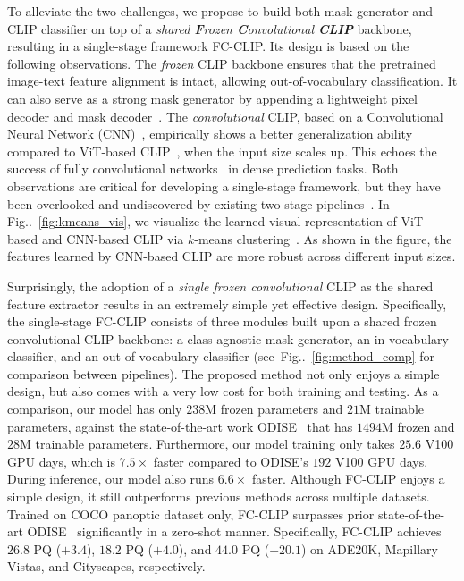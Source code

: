 \documentclass{article}
\makeatletter
\DeclareRobustCommand\onedot{\futurelet\@let@token\@onedot}
\def\@onedot{\ifx\@let@token.\else.\null\fi\xspace}
\newcommand{\figref}[1]{Fig\onedot~\ref{#1}}
\newcommand{\modelname}{FC-CLIP\xspace}
\makeatother
\begin{document}
To alleviate the two challenges, we propose to build both mask generator and CLIP classifier on top of a \textit{shared \textbf{F}rozen \textbf{C}onvolutional \textbf{CLIP}} backbone, resulting in a single-stage framework \modelname.
Its design is based on the following observations.
The \textit{frozen} CLIP backbone ensures that the pretrained image-text feature alignment is intact, allowing out-of-vocabulary classification.
It can also serve as a strong mask generator by appending a lightweight pixel decoder and mask decoder~\cite{cheng2021masked, yu2022k}.
The \textit{convolutional} CLIP, based on a Convolutional Neural Network (CNN)~\cite{lecun1998gradient}, empirically
shows a better generalization ability compared to ViT-based CLIP~\cite{dosovitskiy2020image}, when the input size scales up. 
This echoes the success of fully convolutional networks~\cite{long2014fully} in dense prediction tasks.
Both observations are critical for developing a single-stage framework, but they have been overlooked and undiscovered by existing two-stage pipelines~\cite{ding2022open,xu2023open}.
In \figref{fig:kmeans_vis}, we visualize the learned visual representation of ViT-based and CNN-based CLIP via $k$-means clustering~\cite{lloyd1982least}.
As shown in the figure, the features learned by CNN-based CLIP are more robust across different input sizes.

Surprisingly, the adoption of a \textit{single frozen convolutional} CLIP as the shared feature extractor results in an extremely simple yet effective design.
Specifically, the single-stage \modelname consists of three modules built upon a shared frozen convolutional CLIP backbone: a class-agnostic mask generator, an in-vocabulary classifier, and an out-of-vocabulary classifier (see~\figref{fig:method_comp} for comparison between pipelines).
The proposed method not only enjoys a simple design, but also comes with a very low cost for both training and testing.
As a comparison, our model has only $238$M frozen parameters and $21$M trainable parameters, against the state-of-the-art work ODISE~\cite{xu2023open} that has $1494$M frozen and $28$M trainable parameters.
Furthermore, our model training only takes $25.6$ V100 GPU days, which is $7.5\times$ faster compared to ODISE's $192$ V100 GPU days.
During inference, our model also runs $6.6\times$ faster. 
Although \modelname enjoys a simple design, it still outperforms previous methods across multiple datasets. Trained on COCO panoptic dataset only, \modelname surpasses prior state-of-the-art ODISE~\cite{xu2023open} significantly in a zero-shot manner. Specifically, \modelname achieves $26.8$ PQ ($+3.4$), $18.2$ PQ ($+4.0$), and $44.0$ PQ ($+20.1$) on ADE20K, Mapillary Vistas, and Cityscapes, respectively.
\end{document}
